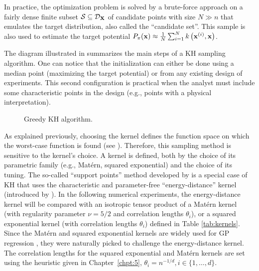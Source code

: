 \begin{remark}
In practice, the optimization problem is solved by a brute-force approach on a fairly dense finite subset $\mathcal{S}\subseteq\mathcal{D}_{{\bf X}}$ of candidate points with size $N \gg n$ that emulates the target distribution, also called the ``candidate set''. 
This sample is also used to estimate the target potential $P_\pi({\bf x}) \approx \frac1N \sum_{i=1}^N k\left({\bf x}^{(i)}, {\bf x}\right)$.
\end{remark}
\medskip

The diagram illustrated in  summarizes the main steps of a KH sampling algorithm. 
One can notice that the initialization can either be done using a median point (maximizing the target potential) or from any existing design of experiments. 
This second configuration is practical when the analyst must include some characteristic points in the design (e.g., points with a physical interpretation). 

\begin{figure}
    \centering
    
    \caption{Greedy KH algorithm.}
    \label{fig:kh_algo}
\end{figure}

As explained previously, choosing the kernel defines the function space on which the worst-case function is found (see ). 
Therefore, this sampling method is sensitive to the kernel's choice. 
A kernel is defined, both by the choice of its parametric family (e.g., Mat\'{e}rn, squared exponential) and the choice of its tuning. 
The so-called ``support points'' method developed by \cite{mak_joseph_2018} is a special case of KH that uses the characteristic and parameter-free ``energy-distance'' kernel (introduced by \citealp{szekely_rizzo_2013}). 
In the following numerical experiments, the energy-distance kernel will be compared with an isotropic tensor product of a Mat\'{e}rn kernel (with regularity parameter $\nu = 5/2$ and correlation lengths $\theta_i$), or a squared exponential kernel (with correlation lengths $\theta_i$) defined in Table \ref{tab:kernels}. 
Since the Mat\'{e}rn and squared exponential kernels are widely used for GP regression \citep{rasmussen_2006}, they were naturally picked to challenge the energy-distance kernel. 
The correlation lengths for the squared exponential and Mat\'{e}rn kernels are set using the heuristic given in Chapter~\ref{chpt:5}, $\theta_i = n^{-1/d}, i \in \{1, \dots, d\}$. 

